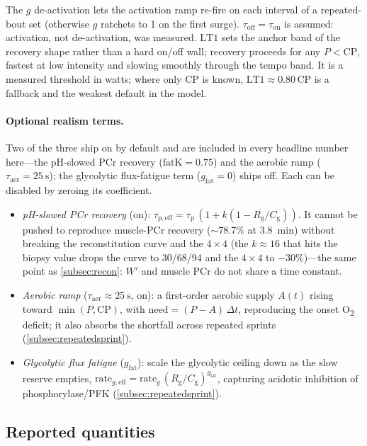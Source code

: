 \documentclass[11pt,a4paper]{article}
\newcommand{\Wp}{\ensuremath{W'}}
\newcommand{\CP}{\ensuremath{\mathrm{CP}}}
\newcommand{\LTone}{\ensuremath{\mathrm{LT1}}}
\newcommand{\Rg}{\ensuremath{R_{\mathrm g}}}
\newcommand{\Cg}{\ensuremath{C_{\mathrm g}}}
\newcommand{\taup}{\ensuremath{\tau_{\mathrm p}}}
\newcommand{\tauon}{\ensuremath{\tau_{\mathrm{on}}}}
\newcommand{\tauoff}{\ensuremath{\tau_{\mathrm{off}}}}
\newcommand{\tauaer}{\ensuremath{\tau_{\mathrm{aer}}}}
\begin{document}
The $g$ de-activation lets the activation ramp re-fire on each interval of a repeated-bout set (otherwise
$g$ ratchets to 1 on the first surge). $\tauoff = \tauon$ is assumed: activation, not de-activation, was
measured.\citep{Parolin1999} \LTone{} sets the anchor band of the recovery shape rather than a hard on/off
wall; recovery proceeds for any $P < \CP$, fastest at low intensity and slowing smoothly through the tempo
band. It is a measured threshold in watts; where only \CP{} is known, $\LTone \approx 0.80\,\CP$ is a
fallback and the weakest default in the model.

\paragraph{Optional realism terms.} Two of the three ship on by default and are included in every headline
number here---the pH-slowed PCr recovery ($\mathrm{fatK} = 0.75$) and the aerobic ramp
($\tauaer = 25~\mathrm{s}$); the glycolytic flux-fatigue term ($g_{\mathrm{fat}} = 0$) ships off. Each can
be disabled by zeroing its coefficient.
\begin{itemize}[leftmargin=1.4em,itemsep=1pt]
\item \emph{pH-slowed PCr recovery} (on): $\tau_{\mathrm{p,eff}} = \taup\,(1 + k(1 - \Rg/\Cg))$. It cannot be
pushed to reproduce muscle-PCr recovery ($\sim$78.7\% at 3.8~min\citep{Bogdanis1996}) without breaking the
reconstitution curve and the $4\times4$ (the $k \approx 16$ that hits the biopsy value drops the curve to
30/68/94 and the $4\times4$ to $-30$\%)---the same point as \cref{subsec:recon}: \Wp{} and muscle PCr do
not share a time constant.
\item \emph{Aerobic ramp} ($\tauaer \approx 25~\mathrm{s}$, on): a first-order aerobic supply $A(t)$ rising
toward $\min(P,\CP)$, with $\mathrm{need} = (P - A)\,\Delta t$, reproducing the onset O\textsubscript{2}
deficit; it also absorbs the shortfall across repeated sprints (\cref{subsec:repeatedsprint}).
\item \emph{Glycolytic flux fatigue} ($g_{\mathrm{fat}}$): scale the glycolytic ceiling down as the slow
reserve empties, $\mathrm{rate}_{g,\mathrm{eff}} = \mathrm{rate}_g\,(\Rg/\Cg)^{g_{\mathrm{fat}}}$,
capturing acidotic inhibition of phosphorylase/PFK (\cref{subsec:repeatedsprint}).
\end{itemize}

\subsection{Reported quantities}\label{subsec:reported}
\end{document}
